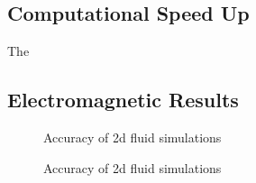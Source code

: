 \documentclass{article}
\begin{document}
\subsection{Computational Speed Up}

The 

\subsection{Electromagnetic Results}


\begin{figure}[!t]
\centering
{}
\caption{Accuracy of 2d fluid simulations }
\label{fig:bouncing_balls_error_3}
\end{figure}

\begin{figure}[!t]
\centering
{}
\caption{Accuracy of 2d fluid simulations }
\label{fig:bouncing_balls_error_3}
\end{figure}
\end{document}

